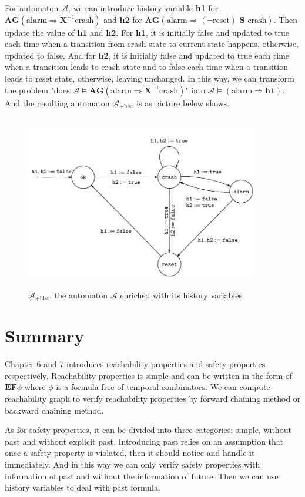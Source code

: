 \documentclass[10pt, conference]{IEEEtran}
\begin{document}
        For automaton $\mathcal{A}$, we can introduce history variable \textbf{h1} for $\textbf{AG}(\text{alarm}\Rightarrow\textbf{X}^{-1}\text{crash})$ and \textbf{h2} for $\textbf{AG}(\text{alarm}\Rightarrow(\neg\text{reset})\textbf{ S }\text{crash})$. Then update the value of \textbf{h1} and \textbf{h2}. For \textbf{h1}, it is initially false and updated to true each time when a transition from crash state to current state happens, otherwise, updated to false. And for \textbf{h2}, it is initially false and updated to true each time when a transition leads to crash state and to false each time when a transition leads to reset state, otherwise, leaving unchanged. In this way, we can transform the problem "does $\mathcal{A}\models\textbf{AG}(\text{alarm}\Rightarrow\textbf{X}^{-1}\text{crash})$" into $\mathcal{A}\models(\text{alarm}\Rightarrow\textbf{h1})$. And the resulting automaton $\mathcal{A}_{+\text{hist}}$ is as picture below shows.
        \begin{figure}[H]
            \centering
            \includegraphics[width=4.0in, height=3.0in]{7_2.jpg}
            \caption{$\mathcal{A}_{+\text{hist}}$, the automaton $\mathcal{A}$ enriched with its history variables}
        \end{figure}
        
    \section{Summary}
        Chapter 6 and 7 introduces reachability properties and safety properties respectively. Reachability properties is simple and can be written in the form of $\textbf{EF}\phi$ where $\phi$ is a formula free of temporal combinators. We can compute reachability graph to verify reachability properties by forward chaining method or backward chaining method.
        
        As for safety properties, it can be divided into three categories: simple, without past and without explicit past. Introducing past relies on an assumption that once a safety property is violated, then it should notice and handle it immediately. And in this way we can only verify safety properties with information of past and without the information of future. Then we can use history variables to deal with past formula.
\end{document}
